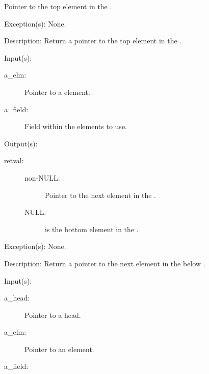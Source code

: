 \begin{capi}
\begin{capilist}
\begin{description}
			Pointer to the top element in the .
		\end{description}
	\item[Exception(s): ] None.
	\item[Description: ]
		Return a pointer to the top element in the .
	\end{capilist}
\label{qs_down}
	\begin{capilist}
	\item[Input(s): ]
		\begin{description}\item[]
		\item[a\_elm: ]
			Pointer to a  element.
		\item[a\_field: ]
			Field within the  elements to use.
		\end{description}
	\item[Output(s): ]
		\begin{description}\item[]
		\item[retval: ]
			\begin{description}\item[]
			\item[non-NULL: ]
				Pointer to the next element in the
				.
			\item[NULL: ]
				 is the bottom element in the
				.
			\end{description}
		\end{description}
	\item[Exception(s): ] None.
	\item[Description: ]
		Return a pointer to the next element in the  below
		.
	\end{capilist}
\label{qs_push}
	\begin{capilist}
	\item[Input(s): ]
		\begin{description}\item[]
		\item[a\_head: ]
			Pointer to a \classname{qs} head.
		\item[a\_elm: ]
			Pointer to an element.
		\item[a\_field: ]

\end{description}
\end{capilist}
\end{capi}
